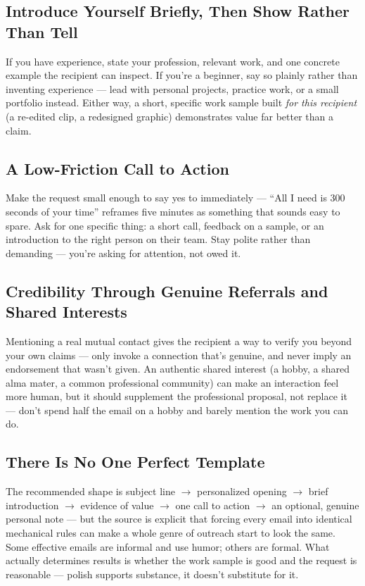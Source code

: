 \subsection{Introduce Yourself Briefly, Then Show Rather Than Tell}

If you have experience, state your profession, relevant work, and one concrete example the recipient can
inspect. If you're a beginner, say so plainly rather than inventing experience — lead with personal projects,
practice work, or a small portfolio instead. Either way, a short, specific work sample built \emph{for this
recipient} (a re-edited clip, a redesigned graphic) demonstrates value far better than a claim.

\subsection{A Low-Friction Call to Action}

Make the request small enough to say yes to immediately — ``All I need is 300 seconds of your time'' reframes
five minutes as something that sounds easy to spare. Ask for one specific thing: a short call, feedback on a
sample, or an introduction to the right person on their team. Stay polite rather than demanding — you're asking
for attention, not owed it.

\subsection{Credibility Through Genuine Referrals and Shared Interests}

Mentioning a real mutual contact gives the recipient a way to verify you beyond your own claims — only invoke a
connection that's genuine, and never imply an endorsement that wasn't given. An authentic shared interest (a
hobby, a shared alma mater, a common professional community) can make an interaction feel more human, but it
should supplement the professional proposal, not replace it — don't spend half the email on a hobby and barely
mention the work you can do.

\subsection{There Is No One Perfect Template}

The recommended shape is subject line $\to$ personalized opening $\to$ brief introduction $\to$ evidence of
value $\to$ one call to action $\to$ an optional, genuine personal note — but the source is explicit that forcing
every email into identical mechanical rules can make a whole genre of outreach start to look the same. Some
effective emails are informal and use humor; others are formal. What actually determines results is whether the
work sample is good and the request is reasonable — polish supports substance, it doesn't substitute for it.

